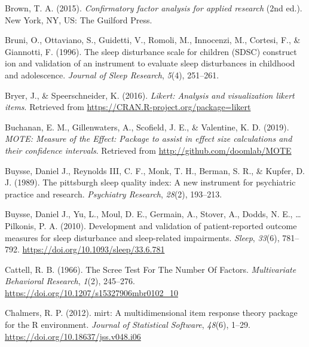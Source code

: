 \documentclass[
  english,
  man]{apa6}
\newlength{\cslhangindent}
\newlength{\cslentryspacingunit} %
\newenvironment{CSLReferences}[2] %
 {%
  \setlength{\parindent}{0pt}
  \ifodd #1
  \let\oldpar\par
  \def\par{\hangindent=\cslhangindent\oldpar}
  \fi
  \setlength{\parskip}{#2\cslentryspacingunit}
 }%
 {}
\begin{document}
\begin{CSLReferences}{1}{0}
\leavevmode{}%
Brown, T. A. (2015). \emph{Confirmatory factor analysis for applied research} (2nd ed.). {New York, NY, US}: {The Guilford Press}.

\leavevmode{}%
Bruni, O., Ottaviano, S., Guidetti, V., Romoli, M., Innocenzi, M., Cortesi, F., \& Giannotti, F. (1996). The sleep disturbance scale for children (SDSC) construct ion and validation of an instrument to evaluate sleep disturbances in childhood and adolescence. \emph{Journal of Sleep Research}, \emph{5}(4), 251--261.

\leavevmode{}%
Bryer, J., \& Speerschneider, K. (2016). \emph{Likert: Analysis and visualization likert items}. Retrieved from \url{https://CRAN.R-project.org/package=likert}

\leavevmode{}%
Buchanan, E. M., Gillenwaters, A., Scofield, J. E., \& Valentine, K. D. (2019). \emph{{MOTE: Measure of the Effect}: Package to assist in effect size calculations and their confidence intervals}. Retrieved from \url{http://github.com/doomlab/MOTE}

\leavevmode{}%
Buysse, Daniel J., Reynolds III, C. F., Monk, T. H., Berman, S. R., \& Kupfer, D. J. (1989). The pittsburgh sleep quality index: A new instrument for psychiatric practice and research. \emph{Psychiatry Research}, \emph{28}(2), 193--213.

\leavevmode{}%
Buysse, Daniel J., Yu, L., Moul, D. E., Germain, A., Stover, A., Dodds, N. E., \ldots{} Pilkonis, P. A. (2010). Development and validation of patient-reported outcome measures for sleep disturbance and sleep-related impairments. \emph{Sleep}, \emph{33}(6), 781--792. \url{https://doi.org/10.1093/sleep/33.6.781}

\leavevmode{}%
Cattell, R. B. (1966). The {Scree Test For The Number Of Factors}. \emph{Multivariate Behavioral Research}, \emph{1}(2), 245--276. \url{https://doi.org/10.1207/s15327906mbr0102_10}

\leavevmode{}%
Chalmers, R. P. (2012). {mirt}: A multidimensional item response theory package for the {R} environment. \emph{Journal of Statistical Software}, \emph{48}(6), 1--29. \url{https://doi.org/10.18637/jss.v048.i06}


\end{CSLReferences}
\end{document}
